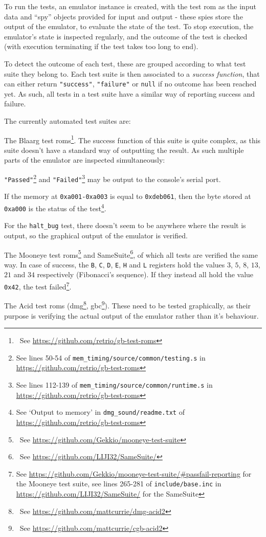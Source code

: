 \documentclass[11pt]{report}
\newcommand{\ftnt}[1]{\footnote{~See \url{#1}}}
\begin{document}
To run the tests, an emulator instance is created, with the test \gls{rom} as the input data and ``spy'' objects provided for input and output - these spies store the output of the emulator, to evaluate the state of the test. To stop execution, the emulator's state is inspected regularly, and the outcome of the test is checked (with execution terminating if the test takes too long to end).

To detect the outcome of each test, these are grouped according to what test suite they belong to. Each test suite is then associated to a \textit{success function}, that can either return \texttt{"success"}, \texttt{"failure"} or \texttt{null} if no outcome has been reached yet. As such, all tests in a test suite have a similar way of reporting success and failure.

The currently automated test suites are:
\begin{compactitem}
	\item The Blaarg test \glspl{rom}\ftnt{https://github.com/retrio/gb-test-roms}. The success function of this suite is quite complex, as this suite doesn't have a standard way of outputting the result. As such multiple parts of the emulator are inspected simultaneously:
		\begin{compactitem}
			\item \texttt{"Passed"}\footnote{See lines 50-54 of \texttt{mem\_timing/source/common/testing.s} in \url{https://github.com/retrio/gb-test-roms}} and \texttt{"Failed"}\footnote{See lines 112-139 of \texttt{mem\_timing/source/common/runtime.s} in \url{https://github.com/retrio/gb-test-roms}} may be output to the console's serial port.
			\item If the memory at \texttt{0xa001-0xa003} is equal to \texttt{0xdeb061}, then the byte stored at \texttt{0xa000} is the status of the test\footnote{See `Output to memory' in \texttt{dmg\_sound/readme.txt} of \url{https://github.com/retrio/gb-test-roms}}.
			\item For the \texttt{halt\_bug} test, there doesn't seem to be anywhere where the result is output, so the graphical output of the emulator is verified.
		\end{compactitem}
	\item The Mooneye test \glspl{rom}\ftnt{https://github.com/Gekkio/mooneye-test-suite} and SameSuite\ftnt{https://github.com/LIJI32/SameSuite/}, of which all tests are verified the same way. In case of success, the \texttt{B}, \texttt{C}, \texttt{D}, \texttt{E}, \texttt{H} and \texttt{L} registers hold the values $3$, $5$, $8$, $13$, $21$ and $34$ respectively (Fibonacci's sequence). If they instead all hold the value \texttt{0x42}, the test failed\footnote{See \url{https://github.com/Gekkio/mooneye-test-suite/\#passfail-reporting} for the Mooneye test suite, see lines 265-281 of \texttt{include/base.inc} in \url{https://github.com/LIJI32/SameSuite/} for the SameSuite}.
	\item The Acid test \glspl{rom} (\gls{dmg}\ftnt{https://github.com/mattcurrie/dmg-acid2}, \gls{gbc}\ftnt{https://github.com/mattcurrie/cgb-acid2}). These need to be tested graphically, as their purpose is verifying the actual output of the emulator rather than it's behaviour.
\end{compactitem}
\end{document}
